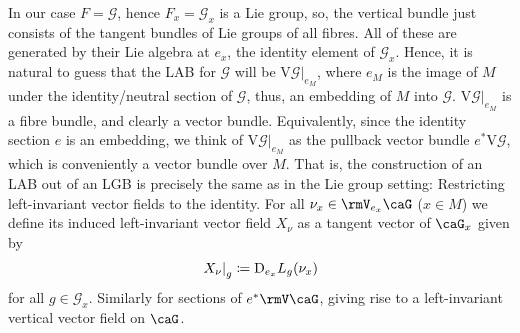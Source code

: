 \documentclass[reqno,a4paper,oneside]{amsart}
\theoremstyle{plain}
\theoremstyle{remark}
\theoremstyle{definition}
\begin{document}
In our case $F = \mathcal{G}$, hence $F_x = \mathcal{G}_x$ is a Lie group, so, the vertical bundle just consists of the tangent bundles of Lie groups of all fibres. All of these are generated by their Lie algebra at $e_x$, the identity element of $\mathcal{G}_x$. Hence, it is natural to guess that the LAB for $\mathcal{G}$ will be $\mathrm{V}\mathcal{G}|_{e_M}$, where $e_M$ is the image of $M$ under the identity/neutral section of $\mathcal{G}$, thus, an embedding of $M$ into $\mathcal{G}$. $\mathrm{V}\mathcal{G}|_{e_M}$ is a fibre bundle, and clearly a vector bundle. Equivalently, since the identity section $e$ is an embedding, we think of $\mathrm{V}\mathcal{G}|_{e_M}$ as the pullback vector bundle $e^*\mathrm{V}\mathcal{G}$, which is conveniently a vector bundle over $M$. That is, the construction of an LAB out of an LGB is precisely the same as in the Lie group setting: Restricting left-invariant vector fields to the identity. For all $\nu_x \in \rmV_{e_x}\caG$ ($x \in M$) we define its induced left-invariant vector field $X_\nu$ as a tangent vector of $\caG_x$ given by
\begin{equation*}
\mleft.X_\nu\mright|_g
\coloneqq
\mathrm{D}_{e_x}L_g \mleft( \nu_x \mright)
\end{equation*}
for all $g \in \mathcal{G}_x$. Similarly for sections of $e^*\rmV\caG$, giving rise to a left-invariant vertical vector field on $\caG$.
\end{document}
